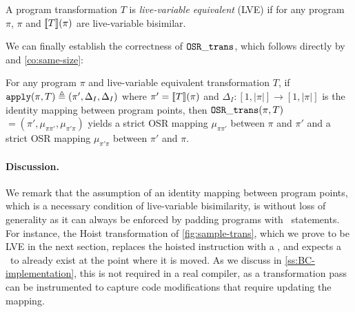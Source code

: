 \begin{definition}
\label{de:lve-trans}
A program transformation $T$ is {\em live-variable equivalent} (LVE) if for any program $\pi$, $\pi$ and $[\![T]\!](\pi)$ are live-variable bisimilar.
\end{definition}

\noindent We can finally establish the correctness of ${\tt OSR\_trans}$, which follows directly by  and \ref{co:same-size}:

\begin{theorem}
\label{th:osr-trans-correctness}
For any program $\pi$ and live-variable equivalent transformation $T$, if ${\tt apply}(\pi,T)\triangleq(\pi', \Delta_I, \Delta_I)$ where $\pi'=[\![T]\!](\pi)$ and $\Delta_I:[1,|\pi|]\rightarrow [1,|\pi|]$ is the identity mapping between program points, then ${\tt OSR\_trans}(\pi,T)$ $=(\pi',\mu_{\pi\pi'},\mu_{\pi'\pi})$ yields a strict OSR mapping $\mu_{\pi\pi'}$ between $\pi$ and $\pi'$ and a strict OSR mapping $\mu_{\pi'\pi}$ between $\pi'$ and $\pi$.
\end{theorem}

\paragraph*{Discussion.} We remark that the assumption of an identity mapping between program points, which is a necessary condition of live-variable bisimilarity, is without loss of generality as it can  always be enforced by padding programs with \wskip\ statements. For instance, the Hoist transformation of \myfigure\ref{fig:sample-trans}, which we prove to be LVE in the next section, replaces the hoisted instruction with a \wskip, and expects a \wskip\ to already exist at the point where it is moved. As we discuss in \mysection\ref{ss:BC-implementation}, this is not required in a real compiler, as a transformation pass can be instrumented to capture code modifications that require updating the mapping.
